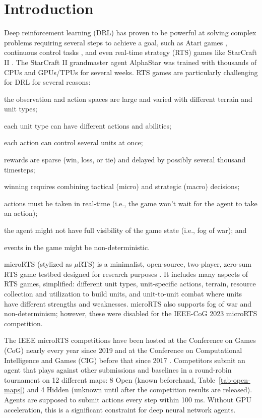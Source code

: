 \documentclass[conference]{IEEEtran}
\begin{document}
\section{Introduction}
Deep reinforcement learning (DRL) has proven to be powerful at solving complex
problems requiring several steps to achieve a goal, such as Atari games \cite{DBLP:journals/corr/MnihKSGAWR13}, continuous
control tasks \cite{DBLP:journals/corr/LillicrapHPHETS15}, and even real-time strategy
(RTS) games like StarCraft II \cite{Vinyals2019GrandmasterLI}. The StarCraft II
grandmaster agent AlphaStar was trained with thousands of
CPUs and GPUs/TPUs for several weeks. RTS games are particularly challenging for DRL for
several reasons:
\begin{inparaenum}[(1)]
    \item the observation and action spaces are large and varied with different terrain and
        unit types;
    \item each unit type can have different actions and abilities;
    \item each action can control several units at once;
    \item rewards are sparse (win, loss, or tie) and delayed by possibly several
    thousand timesteps;
    \item winning requires combining tactical (micro) and strategic (macro) decisions;
    \item actions must be taken in real-time (i.e., the game won't wait for the agent to
        take an action);
    \item the agent might not have full visibility of the game state (i.e., fog of war); and
    \item events in the game might be non-deterministic.
\end{inparaenum}

microRTS (stylized as $\mu$RTS) is a minimalist, open-source, two-player, zero-sum RTS game testbed designed for research
purposes \cite{DBLP:conf/aiide/Ontanon13}. It includes many aspects of RTS games, simplified: different unit types, unit-specific
actions, terrain, resource collection and utilization to build units, and unit-to-unit combat
where units have different strengths and weaknesses. microRTS also supports fog of war
and non-determinism; however, these were disabled for the IEEE-CoG 2023 microRTS
competition.

The IEEE microRTS competitions have been hosted at the Conference on Games (CoG) nearly
every year since 2019 and at the Conference on Computational Intelligence and Games
(CIG) before that since 2017 \cite{Ontañón_Barriga_Silva_Moraes_Lelis_2018}.
Competitors submit an agent that plays against other submissions and baselines in a round-robin tournament
on 12 different maps: 8 Open (known beforehand, Table~\ref{tab-open-maps}) and 4 Hidden (unknown until after the
competition results are released). Agents are supposed
to submit actions every step within 100 ms. Without GPU acceleration, this is a significant constraint for deep neural
network agents.
\end{document}
